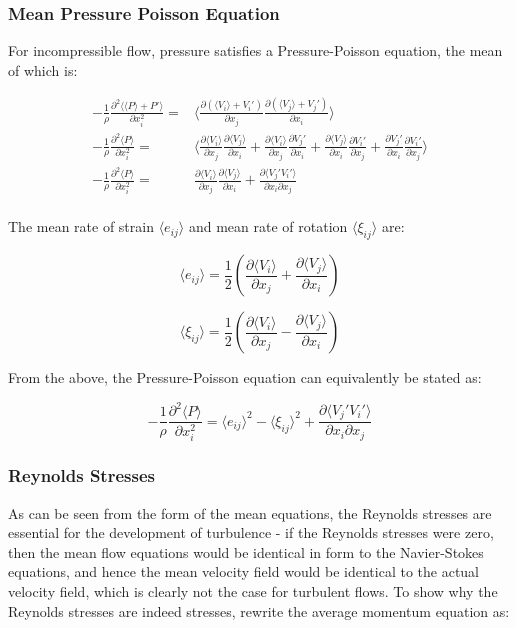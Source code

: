 \documentclass[10pt]{article}
\newcommand{\beq}{\begin{equation}}
\newcommand{\eeq}{\end{equation}}
\newcommand{\beqa}{\begin{equation}\begin{aligned}}
\newcommand{\eeqa}{\end{aligned}\end{equation}}
\newcommand{\la}{\langle}
\newcommand{\ra}{\rangle}
\begin{document}
\begin{flushleft}
\subsubsection{Mean Pressure Poisson Equation}
For incompressible flow, pressure satisfies a Pressure-Poisson equation, the mean of which is:

\beqa
-\frac{1}{\rho}\frac{\partial^2 \la\la P\ra + P'\ra}{\partial x_i^2}=&\la\frac{\partial(\la V_i\ra+V_i')}{\partial x_j}\frac{\partial(\la V_j\ra+V_j')}{\partial x_i}\ra\\
-\frac{1}{\rho}\frac{\partial^2 \la P\ra}{\partial x_i^2}=&\la\frac{\partial\la V_i\ra}{\partial x_j}\frac{\partial\la V_j\ra}{\partial x_i}+\frac{\partial \la V_i\ra}{\partial x_j}\frac{\partial V_j'}{\partial x_i}+\frac{\partial \la V_j\ra}{\partial x_i}\frac{\partial V_i'}{\partial x_j}+\frac{\partial V_j'}{\partial x_i}\frac{\partial V_i'}{\partial x_j}\ra\\
-\frac{1}{\rho}\frac{\partial^2\la P\ra}{\partial x_i^2}=&\frac{\partial\la V_i\ra}{\partial x_j}\frac{\partial\la V_j\ra}{\partial x_i}+\frac{\partial \la V_j'V_i'\ra}{\partial x_i\partial x_j}\\
\eeqa

The mean rate of strain \(\la e_{ij}\ra\) and mean rate of rotation \(\la\xi_{ij}\ra\) are:

\beq
\la e_{ij}\ra=\frac{1}{2}\left(\frac{\partial\la V_i\ra}{\partial x_j}+\frac{\partial\la V_j\ra}{\partial x_i}\right)
\eeq 

\beq
\la \xi_{ij}\ra=\frac{1}{2}\left(\frac{\partial\la V_i\ra}{\partial x_j}-\frac{\partial\la V_j\ra}{\partial x_i}\right)
\eeq 

From the above, the Pressure-Poisson equation can equivalently be stated as:

\beq
-\frac{1}{\rho}\frac{\partial^2\la P\ra}{\partial x_i^2}=\la e_{ij}\ra^2-\la \xi_{ij}\ra^2+\frac{\partial \la V_j'V_i'\ra}{\partial x_i\partial x_j}
\eeq




\subsubsection{Reynolds Stresses}

As can be seen from the form of the mean equations, the Reynolds stresses are essential for the development of turbulence - if the Reynolds stresses were zero, then the mean flow equations would be identical in form to the Navier-Stokes equations, and hence the mean velocity field would be identical to the actual velocity field, which is clearly not the case for turbulent flows. To show why the Reynolds stresses are indeed stresses, rewrite the average momentum equation as:


\end{flushleft}
\end{document}
